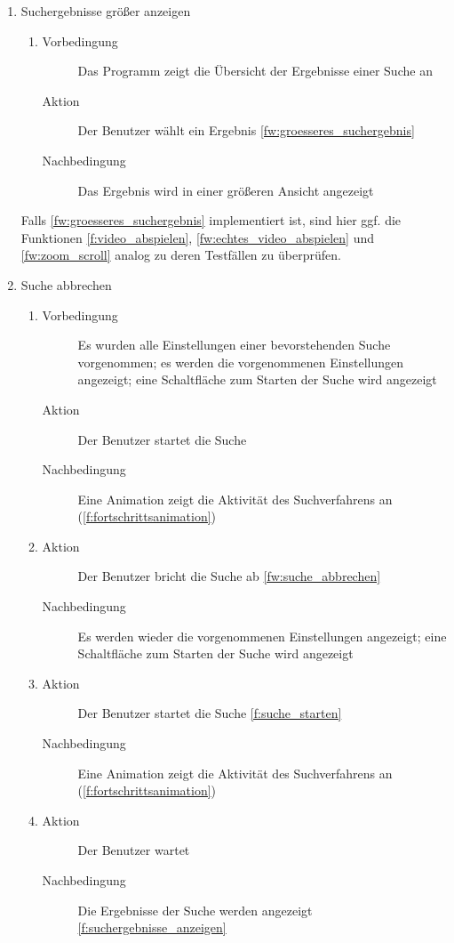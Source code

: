 \begin{enumerate} [label=\bfseries /TSW \arabic*0/, leftmargin=*]
	\item Suchergebnisse größer anzeigen \label{ts:groesseres_suchergebnis}
	\begin{enumerate}[leftmargin=0pt]
		\item
		\begin{description}
			\item[Vorbedingung] Das Programm zeigt die Übersicht der Ergebnisse einer Suche an
			\item[Aktion] Der Benutzer wählt ein Ergebnis \ref{fw:groesseres_suchergebnis}
			\item[Nachbedingung] Das Ergebnis wird in einer größeren Ansicht angezeigt
		\end{description}
	\end{enumerate}
	Falls \ref{fw:groesseres_suchergebnis} implementiert ist, sind hier ggf. die Funktionen \ref{f:video_abspielen}, \ref{fw:echtes_video_abspielen} und \ref{fw:zoom_scroll} analog zu deren Testfällen zu überprüfen.

	\item Suche abbrechen \label{ts:suche_abbrechen}
	\begin{enumerate}[leftmargin=0pt]
		\item
		\begin{description}
			\item[Vorbedingung] Es wurden alle Einstellungen einer bevorstehenden Suche vorgenommen; es werden die vorgenommenen Einstellungen angezeigt; eine Schaltfläche zum Starten der Suche wird angezeigt
			\item[Aktion] Der Benutzer startet die Suche
			\item[Nachbedingung] Eine Animation zeigt die Aktivität des Suchverfahrens an (\ref{f:fortschrittsanimation})
		\end{description}
		\item
		\begin{description}
			\item[Aktion] Der Benutzer bricht die Suche ab \ref{fw:suche_abbrechen}
			\item[Nachbedingung] Es werden wieder die vorgenommenen Einstellungen angezeigt; eine Schaltfläche zum Starten der Suche wird angezeigt
		\end{description}
		\item
		\begin{description}
			\item[Aktion] Der Benutzer startet die Suche \ref{f:suche_starten}
			\item[Nachbedingung] Eine Animation zeigt die Aktivität des Suchverfahrens an (\ref{f:fortschrittsanimation})
		\end{description}
		\item
		\begin{description}
			\item[Aktion] Der Benutzer wartet \label{test}
			\item[Nachbedingung] Die Ergebnisse der Suche werden angezeigt \ref{f:suchergebnisse_anzeigen}
		\end{description}
	\end{enumerate}


\end{enumerate}
